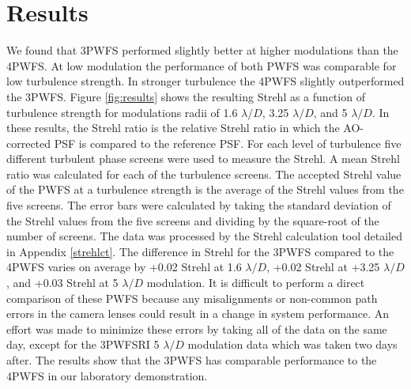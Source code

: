 
 





\section{Results}
We found that 3PWFS performed slightly better at higher modulations than the 4PWFS. At low modulation the performance of both PWFS was comparable for low turbulence strength. In stronger turbulence the 4PWFS slightly outperformed the 3PWFS. Figure \ref{fig:results} shows the resulting Strehl as a function of turbulence strength for modulations radii of 1.6 $\lambda/D$, 3.25 $\lambda/D$, and 5 $\lambda/D$. In these results, the Strehl ratio is the relative Strehl ratio in which the AO-corrected PSF is compared to the reference PSF. For each level of turbulence five different turbulent phase screens were used to measure the Strehl. A mean Strehl ratio was calculated for each of the turbulence screens. The accepted Strehl value of the PWFS at a turbulence strength is the average of the Strehl values from the five screens. The error bars were calculated by taking the standard deviation of the Strehl values from the five screens and dividing by the square-root of the number of screens. The data was processed by the Strehl calculation tool detailed in Appendix \ref{strehlct}. The difference in Strehl for the 3PWFS compared to the 4PWFS varies on average by +0.02 Strehl at 1.6 $\lambda/D$, +0.02 Strehl at +3.25 $\lambda/D$, and +0.03 Strehl at 5 $\lambda/D$ modulation. It is difficult to perform a direct comparison of these PWFS because any misalignments or non-common path errors in the camera lenses could result in a change in system performance. An effort was made to minimize these errors by taking all of the data on the same day, except for the 3PWFSRI 5 $\lambda/D$ modulation data which was taken two days after. The results show that the 3PWFS has comparable performance to the 4PWFS in our laboratory demonstration. 


